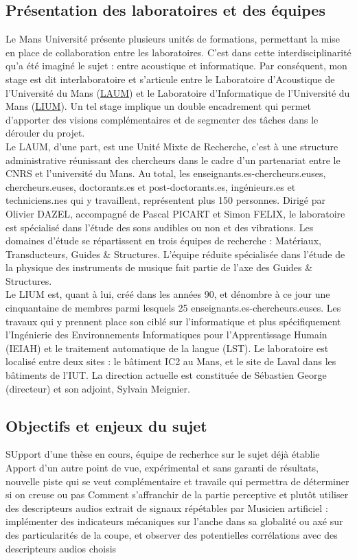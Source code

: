 \subsection{Présentation des laboratoires et des équipes}

    Le Mans Université présente plusieurs unités de formations, permettant la mise en place de collaboration entre les laboratoires. C'est dans cette interdisciplinarité qu'a été imaginé le sujet : entre acoustique et informatique. Par conséquent, mon stage est dit interlaboratoire et s'articule entre le Laboratoire d'Acoustique de l'Université du Mans (\href{https://laum.univ-lemans.fr/fr/index.html}{LAUM}) et le Laboratoire d'Informatique de l'Université du Mans (\href{https://lium.univ-lemans.fr/}{LIUM}). Un tel stage implique un double encadrement qui permet d'apporter des visions complémentaires et de segmenter des tâches dans le dérouler du projet. \\


    Le LAUM, d'une part, est une Unité Mixte de Recherche, c'est à une structure administrative réunissant des chercheurs dans le cadre d'un partenariat entre le CNRS et l'université du Mans. Au total, les enseignants.es-chercheurs.euses, chercheurs.euses, doctorants.es et post-doctorants.es, ingénieurs.es et techniciens.nes qui y travaillent, représentent plus 150 personnes. Dirigé par Olivier DAZEL, accompagné de Pascal PICART et Simon FELIX, le laboratoire est spécialisé dans l'étude des sons audibles ou non et des vibrations. Les domaines d'étude se répartissent en trois équipes de recherche : Matériaux, Transducteurs, Guides \& Structures. L'équipe réduite spécialisée dans l'étude de la physique des instruments de musique fait partie de l'axe des Guides \& Structures. \\

    
    Le LIUM est, quant à lui, créé dans les années 90, et dénombre à ce jour une cinquantaine de membres parmi lesquels 25 enseignants.es-chercheurs.euses. Les travaux qui y prennent place son ciblé sur l'informatique et plus spécifiquement l’Ingénierie des Environnements Informatiques pour l’Apprentissage Humain (IEIAH) et le traitement automatique de la langue (LST). Le laboratoire est localisé entre deux sites : le bâtiment IC2 au Mans, et le site de Laval dans les bâtiments de l’IUT. La direction actuelle est constituée de Sébastien George (directeur) et son adjoint, Sylvain Meignier.


\subsection{Objectifs et enjeux du sujet}

        SUpport d'une thèse en cours, équipe de recherhce sur le sujet déjà établie 
        Apport d'un autre point de vue, expérimental et sans garanti de résultats, nouvelle piste qui se veut complémentaire et travaile qui permettra de déterminer si on creuse ou pas
        Comment s'affranchir de la partie perceptive et plutôt utiliser des descripteurs audios extrait de signaux répétables par Musicien artificiel : implémenter des indicateurs mécaniques sur l'anche dans sa globalité ou axé sur des particularités de la coupe, et observer des potentielles corrélations avec des descripteurs audios choisis